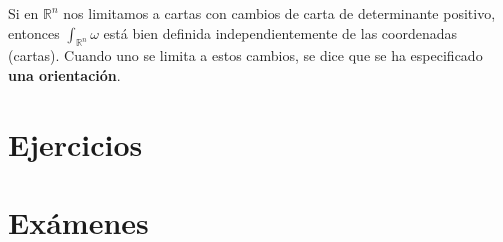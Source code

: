 \documentclass[palatino, bibnumbers]{apuntes}
\begin{document}
 \indent Si en $\mathbb{R}^n$ nos limitamos a cartas con cambios de carta de determinante positivo, entonces $\int_{\mathbb{R}^n}\omega$ está bien definida independientemente de las coordenadas (cartas).
 Cuando uno se limita a estos cambios, se dice que se ha especificado \textbf{una orientación}.

 
\appendix

\chapter{Ejercicios}

\chapter{Exámenes}


\printindex
\end{document}
